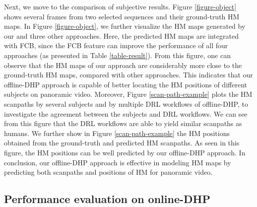 \documentclass[10pt,journal,compsoc]{IEEEtran}
\begin{document}



Next, we move to the comparison of subjective results. Figure \ref{figure-object} shows several frames from two selected sequences and their ground-truth HM maps.
In Figure \ref{figure-object}, we further visualize the HM maps generated by our and three other approaches. Here, the predicted HM maps are integrated with FCB, since the FCB feature can improve the performance of all four approaches (as presented in Table \ref{table-result}).
From this figure, one can observe that the HM maps of our approach are considerably more close to the ground-truth HM maps, compared with other approaches.
This indicates that our offline-DHP approach is capable of better locating the HM positions of different subjects on panoramic video.
Moreover, Figure \ref{scan-path-example} plots the HM scanpaths by several subjects and by multiple DRL workflows of offline-DHP, to investigate the agreement between the subjects and DRL workflows.
We can see from this figure that the DRL workflows are able to yield similar scanpaths as humans.  We further show in Figure \ref{scan-path-example} the HM positions obtained from the ground-truth and predicted HM scanpaths. As seen in this figure, the HM positions can be well predicted by our offline-DHP approach. In conclusion, our offline-DHP approach is effective in modeling HM maps by predicting both scanpaths and positions of HM for panoramic video.





\subsection{Performance evaluation on online-DHP}\label{sec:evaluation_online}
\label{online-compare}

\end{document}
